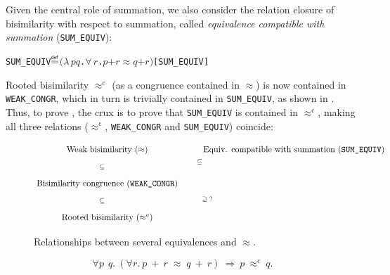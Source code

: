 \documentclass[GCNS]{yincog}
\renewcommand{\HOLConst}[1]{\texttt{#1}}
\renewcommand{\HOLBoundVar}[1]{\ensuremath{\mathit{#1}}}
\renewcommand{\HOLSymConst}[1]{#1}
\renewcommand{\HOLTokenDefEquality}{\ensuremath{\mathrel{\overset{\makebox [0pt]{\text{\tiny \textsf{def}}}}{=}}}}
\renewcommand{\HOLTokenForall}{\ensuremath{\forall \,}}
\renewcommand{\HOLTokenLambda}{\ensuremath{\lambda \,}}
\theoremstyle{remark}
\theoremstyle{theorem}
\theoremstyle{remark}
\newcommand{\HOLTokenWeakEQ}{$\approx$}
\newcommand{\rapprox}{\mathrel{\approx^{\mathrm{c}}}}
\newcommand{\wbvtex}{\approx}
\begin{document}
Given the central role of summation, we also consider the relation closure
of bisimilarity with respect to summation, called
\emph{equivalence compatible with summation} (\texttt{SUM\_EQUIV}):
%
\begin{alltt}
   \HOLConst{SUM\_EQUIV} \HOLTokenDefEquality{} \ensuremath{(}\HOLTokenLambda{}\HOLBoundVar{p} \HOLBoundVar{q}. \HOLSymConst{\HOLTokenForall{}}\HOLBoundVar{r}. \HOLBoundVar{p} \HOLSymConst{\ensuremath{+}} \HOLBoundVar{r} \HOLSymConst{\HOLTokenWeakEQ} \HOLBoundVar{q} \HOLSymConst{\ensuremath{+}} \HOLBoundVar{r}\ensuremath{)}\hfill{[SUM\_EQUIV]}
\end{alltt}

Rooted bisimilarity $\rapprox $ (as a congruence contained in
$\wbvtex $) is now contained in \texttt{WEAK\_CONGR}, which in turn is trivially
contained in \texttt{SUM\_EQUIV}, as shown in .
Thus, to prove , the crux is to prove that
\texttt{SUM\_EQUIV} is contained in $\rapprox $, making all three relations
($\rapprox $, \texttt{WEAK\_CONGR} and \texttt{SUM\_EQUIV}) coincide:
%
\begin{figure}%
%
\begin{sgmlfig}\normalsize
%
$$\xymatrix{
{\textrm{Weak bisimilarity } (\approx )} & {\textrm{Equiv.
compatible with summation (\texttt{SUM\_EQUIV})}}
\ar@/^3ex/[ldd]^{\supseteq \; ?}\\
{\textrm{Bisimilarity congruence (\texttt{WEAK\_CONGR})}}
\ar[u]^{\subseteq} \ar[ru]^{\subseteq} \\
{\textrm{Rooted bisimilarity } (\rapprox )} \ar[u]^{\subseteq}
}$$
\end{sgmlfig}
%
\caption{Relationships between several equivalences and $\wbvtex $.}
 \label{fig:relationship}
\end{figure}\vspace{-3pt}
\begin{equation}
 \label{equa:pq}
\forall p\ \ q.\ ( \forall r.\ p\ +\ r \;\approx \; q\ +\ r ) \
\Longrightarrow \ p\ \rapprox \ \! q.
\end{equation}
\end{document}
